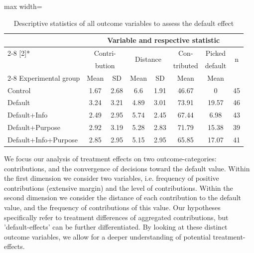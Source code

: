 \documentclass[review, authoryear,12pt]{elsarticle}
\begin{document}
\begin{table}[htbp]
  \centering
  \begin{adjustbox}{max width=\textwidth}
  \caption{Descriptive statistics of all outcome variables to assess the default effect}
    \label{tab2}%
    \begin{tabular}{lccccccc}
    \toprule
    \toprule
          & \multicolumn{7}{c}{Variable and respective statistic} \\
\cmidrule{2-8}    \multirow{2}[2]{*}{} & \multicolumn{2}{c}{Contri-} & \multicolumn{2}{c}{\multirow{2}[2]{*}{Distance}} & Con-  & Picked & \multirow{2}[2]{*}{n} \\
          & \multicolumn{2}{c}{bution} & \multicolumn{2}{c}{} & tributed & default &  \\
\cmidrule{2-8}    Experimental group & Mean  & SD    & Mean  & SD    & Mean  & Mean  &  \\
    \midrule
    Control & 1.67  & 2.68  & 6.6   & 1.91  & 46.67 & 0     & 45 \\
    Default & 3.24  & 3.21  & 4.89  & 3.01  & 73.91 & 19.57 & 46 \\
    Default+Info & 2.49  & 2.95  & 5.74  & 2.45  & 67.44 & 6.98  & 43 \\
    Default+Purpose & 2.92  & 3.19  & 5.28  & 2.83  & 71.79 & 15.38 & 39 \\
    Default+Info+Purpose & 2.85  & 2.95  & 5.15  & 2.95  & 65.85 & 17.07 & 41 \\
    \bottomrule
    \bottomrule
    \end{tabular}%
	\end{adjustbox}
\end{table}%


We focus our analysis of treatment effects on two outcome-categories: contributions, and the convergence of decisions toward the default value. Within the first dimension we consider two variables, i.e. frequency of positive contributions (extensive margin) and the level of contributions. Within the second dimension we consider the distance of each contribution to the default value, and the frequency of contributions of this value. Our hypotheses specifically refer to treatment differences of aggregated contributions, but 'default-effects' can be further differentiated. By looking at these distinct outcome variables, we allow for a deeper understanding of potential treatment-effects.
\end{document}
